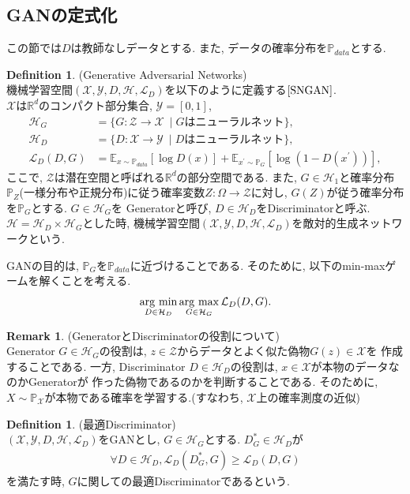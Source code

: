 \documentclass[11pt, a4paper, dvipdfmx]{jsarticle}
\theoremstyle{definition}
\newtheorem{Definition+}[Axiom+]{Definition}
\newtheorem{Remark+}[Axiom+]{Remark}
\newcommand{\R}{\mathbb{R}}
\newcommand{\X}{\mathcal{X}}
\newcommand{\Y}{\mathcal{Y}}
\newcommand{\Hil}{\mathcal{H}}
\newcommand{\Loss}{\mathcal{L}_{D}}
\newcommand{\MLsp}{(\X, \Y, D, \Hil, \Loss)}
\newcommand{\argmax}{\mathop{\rm arg~max}\limits}
\newcommand{\argmin}{\mathop{\rm arg~min}\limits}
\begin{document}
\subsection{GANの定式化}
この節では$D$は教師なしデータとする. また, データの確率分布を$\mathbb{P}_{data}$とする. 
\begin{Definition+}(Generative Adversarial Networks)\\
    機械学習空間$\MLsp$を以下のように定義する$\cite{SNGAN}$. \\ 
    $\X\text{は}\R^{d}\text{のコンパクト部分集合}$, $\Y = [0, 1]$, 
    \begin{align*}
        \Hil_{G} &= \{G:\mathcal{Z}\to\X~\mid G\text{はニューラルネット}\},\\
        \Hil_{D} &= \{D:\X\to\Y~\mid D\text{はニューラルネット}\},\\
        \Loss(D, G) &= \mathbb{E}_{x\sim \mathbb{P}_{data}}[\log D(x)] + \mathbb{E}_{x^{\prime}\sim \mathbb{P}_{G}}[\log(1 - D(x^{\prime}))],
    \end{align*}
    ここで, $\mathcal{Z}$は潜在空間と呼ばれる$\R^d$の部分空間である. 
    また, $G\in\Hil_{1}$と確率分布$\mathbb{P}_{Z}$(一様分布や正規分布)に従う確率変数$Z:\Omega\to\mathcal{Z}$に対し, $G(Z)$が従う確率分布を$\mathbb{P}_{G}$とする. $G\in\Hil_{G}$を
    Generatorと呼び, $D\in\Hil_{D}$をDiscriminatorと呼ぶ.
    $\Hil = \Hil_{D}\times\Hil_{G}$とした時, 機械学習空間$\MLsp$を敵対的生成ネットワークという. 
\end{Definition+}
GANの目的は, $\mathbb{P}_{G}$を$\mathbb{P}_{data}$に近づけることである. そのために, 以下のmin-maxゲームを解くことを考える. 
\begin{align*}
    \argmin_{D\in\Hil_{D}}\argmax_{G\in\Hil_{G}}\Loss(D, G).
\end{align*}
\begin{Remark+}(GeneratorとDiscriminatorの役割について)\\
    Generator $G\in\Hil_{G}$の役割は, $z\in\mathcal{Z}$からデータとよく似た偽物$G(z)\in\X$を
    作成することである. 一方, Discriminator $D\in\Hil_{D}$の役割は, $x\in\X$が本物のデータなのかGeneratorが
    作った偽物であるのかを判断することである. そのために, $X\sim\mathbb{P}_{\X}$が本物である確率を学習する.(すなわち, $\X$上の確率測度の近似)
\end{Remark+}
\begin{Definition+}(最適Discriminator)\\
    $\MLsp$をGANとし, $G\in\Hil_{G}$とする. $D_{G}^{*}\in\Hil_{D}$が
    \begin{align*}
        \forall D\in\Hil_{D}, \Loss(D_{G}^{*}, G) \geq \Loss(D, G)
    \end{align*}
    を満たす時, $G$に関しての最適Discriminatorであるという.
\end{Definition+}
\end{document}
